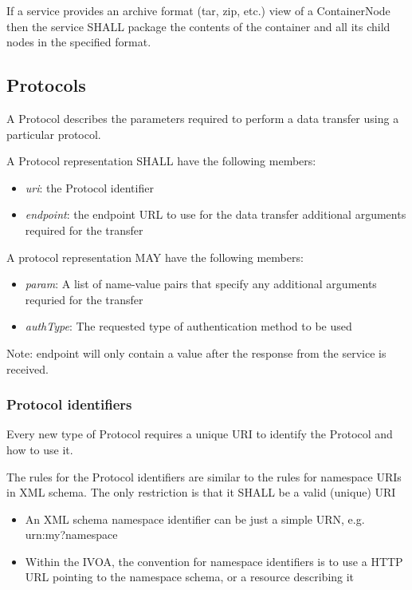 \documentclass[11pt,a4paper]{ivoa}
\begin{document}
If a service provides an archive format (tar, zip, etc.) view of a ContainerNode then the service SHALL package the contents of the container and all its child nodes in the specified format.

\subsection{Protocols}
A Protocol describes the parameters required to perform a data transfer using a particular protocol.

A Protocol representation SHALL have the following members:

\begin{itemize}
    \item \emph{uri}: the Protocol identifier
    \item \emph{endpoint}: the endpoint URL to use for the data transfer additional arguments required for the transfer
\end{itemize}

A protocol representation MAY have the following members:

\begin{itemize}
    \item \emph{param}: A list of name-value pairs that specify any additional arguments requried for the transfer
    \item \emph{authType}: The requested type of authentication method to be used
\end{itemize}

Note: endpoint will only contain a value after the response from the service is received.

\subsubsection{Protocol identifiers}
Every new type of Protocol requires a unique URI to identify the Protocol and how to use it.

The rules for the Protocol identifiers are similar to the rules for namespace URIs in XML schema. The only restriction is that it SHALL be a valid (unique) URI

\begin{itemize}
    \item An XML schema namespace identifier can be just a simple URN, e.g. urn:my?namespace
    \item Within the IVOA, the convention for namespace identifiers is to use a HTTP URL pointing to the namespace schema, or a resource describing it
\end{itemize}
\end{document}
